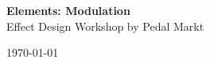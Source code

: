 \documentclass[a4paper,12pt]{article}
\begin{document}
\begin{titlepage}
  \begin{center}
    \Large\textbf{Elements: Modulation}\\
    \large{Effect Design Workshop by Pedal Markt}
  \end{center}
  \vspace*{\fill}
  \begin{center}
    \today
  \end{center}
\end{titlepage}
\end{document}
